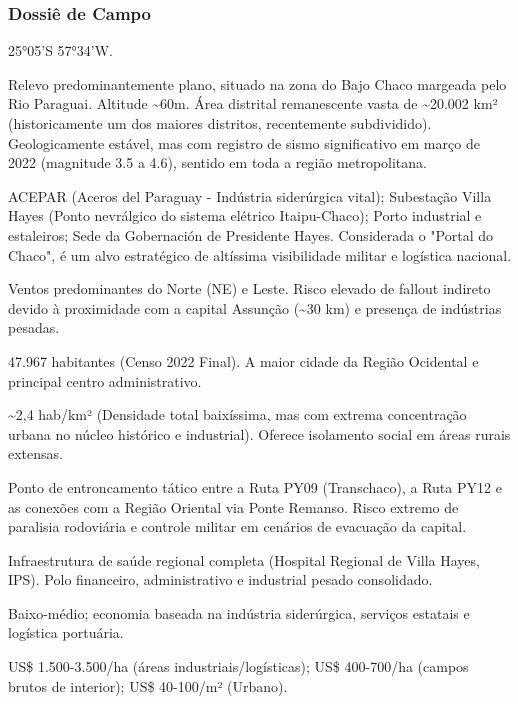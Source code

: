 \subsubsection{Dossiê de Campo}
\begin{description}[style=nextline,leftmargin=0.5cm,font=\bfseries]
\item[Coordenadas]  25°05'S 57°34'W.
\item[Topografia]  Relevo predominantemente plano, situado na zona do Bajo Chaco margeada pelo Rio Paraguai. Altitude \textasciitilde 60m. Área distrital remanescente vasta de \textasciitilde 20.002 km² (historicamente um dos maiores distritos, recentemente subdividido). Geologicamente estável, mas com registro de sismo significativo em março de 2022 (magnitude 3.5 a 4.6), sentido em toda a região metropolitana.
\item[Alvos Estratégicos]  ACEPAR (Aceros del Paraguay - Indústria siderúrgica vital); Subestação Villa Hayes (Ponto nevrálgico do sistema elétrico Itaipu-Chaco); Porto industrial e estaleiros; Sede da Gobernación de Presidente Hayes. Considerada o "Portal do Chaco", é um alvo estratégico de altíssima visibilidade militar e logística nacional.
\item[Fallout]  Ventos predominantes do Norte (NE) e Leste. Risco elevado de fallout indireto devido à proximidade com a capital Assunção (\textasciitilde 30 km) e presença de indústrias pesadas.
\item[População]  47.967 habitantes (Censo 2022 Final). A maior cidade da Região Ocidental e principal centro administrativo.
\item[Densidade]  \textasciitilde 2,4 hab/\allowbreak km² (Densidade total baixíssima, mas com extrema concentração urbana no núcleo histórico e industrial). Oferece isolamento social em áreas rurais extensas.
\item[Vias de Acesso]  Ponto de entroncamento tático entre a Ruta PY09 (Transchaco), a Ruta PY12 e as conexões com a Região Oriental via Ponte Remanso. Risco extremo de paralisia rodoviária e controle militar em cenários de evacuação da capital.
\item[Serviços]  Infraestrutura de saúde regional completa (Hospital Regional de Villa Hayes, IPS). Polo financeiro, administrativo e industrial pesado consolidado.
\item[Custo de Vida]  Baixo-médio; economia baseada na indústria siderúrgica, serviços estatais e logística portuária.
\item[Preço da Terra]  US\$ 1.500-3.500/\allowbreak ha (áreas industriais/\allowbreak logísticas); US\$ 400-700/\allowbreak ha (campos brutos de interior); US\$ 40-100/\allowbreak m² (Urbano).

\end{description}
